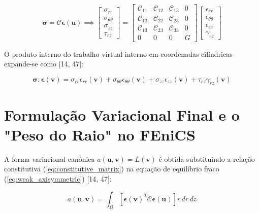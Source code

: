 \begin{equation}
  \mathbf{\sigma} = \mathbf{\mathcal{C}} \mathbf{\epsilon}(\mathbf{u}) \implies
  \begin{bmatrix}
    \sigma_{rr} \\ \sigma_{\theta\theta} \\ \sigma_{zz} \\ \tau_{rz}
  \end{bmatrix} =
  \begin{bmatrix}
    \mathcal{C}_{11} & \mathcal{C}_{12} & \mathcal{C}_{13} & 0 \\
    \mathcal{C}_{12} & \mathcal{C}_{22} & \mathcal{C}_{23} & 0 \\
    \mathcal{C}_{13} & \mathcal{C}_{23} & \mathcal{C}_{33} & 0 \\
    0 & 0 & 0 & G
  \end{bmatrix}
  \begin{bmatrix}
    \epsilon_{rr} \\ \epsilon_{\theta\theta} \\ \epsilon_{zz} \\ \gamma_{rz}
  \end{bmatrix}
  \label{eq:constitutive_matrix}
\end{equation}

O produto interno do trabalho virtual interno em coordenadas cilíndricas expande-se como [14, 47]:

\begin{equation}
  \mathbf{\sigma} : \mathbf{\epsilon}(\mathbf{v}) = \sigma_{rr} \epsilon_{rr}(\mathbf{v}) + \sigma_{\theta\theta} \epsilon_{\theta\theta}(\mathbf{v}) + \sigma_{zz} \epsilon_{zz}(\mathbf{v}) + \tau_{rz} \gamma_{rz}(\mathbf{v})
  \label{eq:stress_strain_inner}
\end{equation}

\section{Formulação Variacional Final e o "Peso do Raio" no FEniCS}

A forma variacional canônica $a(\mathbf{u}, \mathbf{v}) = L(\mathbf{v})$ é obtida substituindo a relação constitutiva (\eqref{eq:constitutive_matrix}) na equação de equilíbrio fraco (\eqref{eq:weak_axisymmetric}) [14, 47]:

\begin{equation}
  a(\mathbf{u}, \mathbf{v}) = \int_{\Omega} \left[ \mathbf{\epsilon}(\mathbf{v})^T \mathbf{\mathcal{C}} \mathbf{\epsilon}(\mathbf{u}) \right] r \, d r \, d z
  \label{eq:bilinear_form}
\end{equation}

